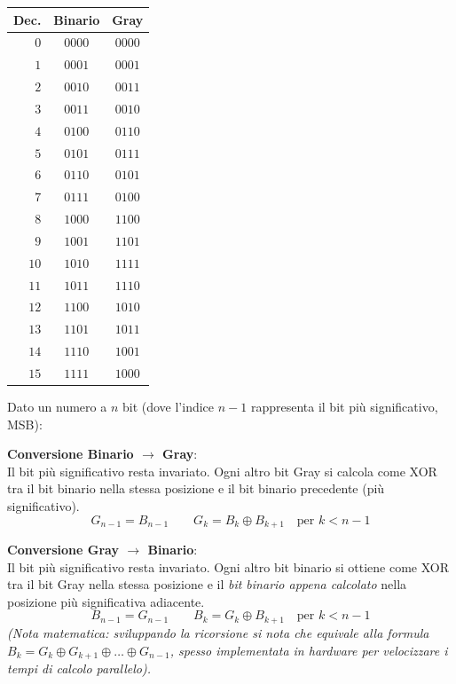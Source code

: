 \documentclass[11pt,a4paper]{report}
\begin{document}
\begin{minipage}[t]{0.30\linewidth}
\vspace{0pt}
\centering
\begin{tabular}{r c c}
\toprule
Dec. & Binario & Gray\\
\midrule
$0$  & $0000$ & $0000$ \\
$1$  & $0001$ & $0001$ \\
$2$  & $0010$ & $0011$ \\
$3$  & $0011$ & $0010$ \\
$4$  & $0100$ & $0110$ \\
$5$  & $0101$ & $0111$ \\
$6$  & $0110$ & $0101$ \\
$7$  & $0111$ & $0100$ \\
\midrule
$8$  & $1000$ & $1100$ \\
$9$  & $1001$ & $1101$ \\
$10$ & $1010$ & $1111$ \\
$11$ & $1011$ & $1110$ \\
$12$ & $1100$ & $1010$ \\
$13$ & $1101$ & $1011$ \\
$14$ & $1110$ & $1001$ \\
$15$ & $1111$ & $1000$ \\
\bottomrule
\end{tabular}
\end{minipage}%
\hfill
\begin{minipage}[t]{0.66\linewidth}
\vspace{0pt}
\noindent Dato un numero a $n$ bit (dove l'indice $n-1$ rappresenta il bit più significativo, MSB):

\medskip
\textbf{Conversione Binario $\to$ Gray}:\\
Il bit più significativo resta invariato. Ogni altro bit Gray si calcola come XOR tra il bit binario nella stessa posizione e il bit binario precedente (più significativo).
\[
G_{n-1} = B_{n-1} \qquad G_k = B_k \oplus B_{k+1} \quad \text{per } k < n-1
\]

\medskip
\textbf{Conversione Gray $\to$ Binario}:\\
Il bit più significativo resta invariato. Ogni altro bit binario si ottiene come XOR tra il bit Gray nella stessa posizione e il \emph{bit binario appena calcolato} nella posizione più significativa adiacente.
\[
B_{n-1} = G_{n-1} \qquad B_k = G_k \oplus B_{k+1} \quad \text{per } k < n-1
\]
\textit{(Nota matematica: sviluppando la ricorsione si nota che equivale alla formula $B_k = G_k \oplus G_{k+1} \oplus \dots \oplus G_{n-1}$, spesso implementata in hardware per velocizzare i tempi di calcolo parallelo).}
\end{minipage}
\end{document}
